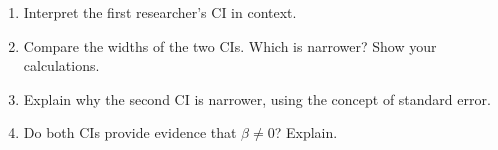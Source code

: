 \documentclass[10pt]{article}
\begin{document}
\begin{enumerate}
\begin{enumerate}[label=\alph*.]
          \item Interpret the first researcher's CI in context.


          \item Compare the widths of the two CIs. Which is narrower?
                Show your calculations.


          \item Explain why the second CI is narrower, using the concept of standard error.


          \item Do both CIs provide evidence that $\beta \ne 0$? Explain.


        \end{enumerate}

\end{enumerate}
\end{document}
